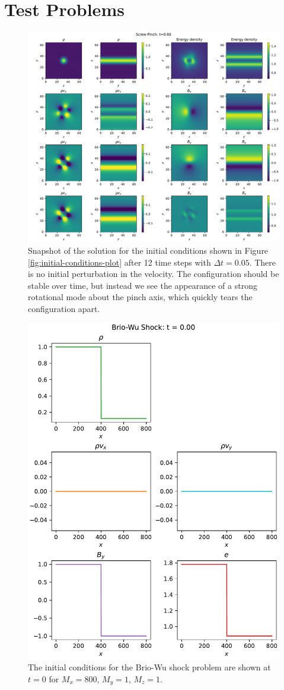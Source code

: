 \documentclass[%
 reprint,
 amsmath,amssymb,
 aps,
]{revtex4-2}
\begin{document}
\section{Test Problems}
\begin{figure}
\includegraphics[width=0.9\linewidth]{proj2-2/mhd_snapshot_n_3.pdf}
\caption{\label{fig:screw-pinch-snapshot}Snapshot of the solution for the initial conditions shown in Figure \ref{fig:initial-conditions-plot} after 12 time steps with $\Delta t = 0.05$. There is no initial perturbation in the velocity. The configuration should be stable over time, but instead we see the appearance of a strong rotational mode about the pinch axis, which quickly tears the configuration apart.}
\end{figure}

\begin{figure}
\includegraphics[width=0.7\linewidth]{proj2-2/shock_snapshots_n_0.pdf}
\caption{\label{fig:brio-wu-initial-conditions}The initial conditions for the Brio-Wu shock problem are shown at $t=0$ for $M_x = 800$, $M_y = 1$, $M_z = 1$.}
\end{figure}
\end{document}
